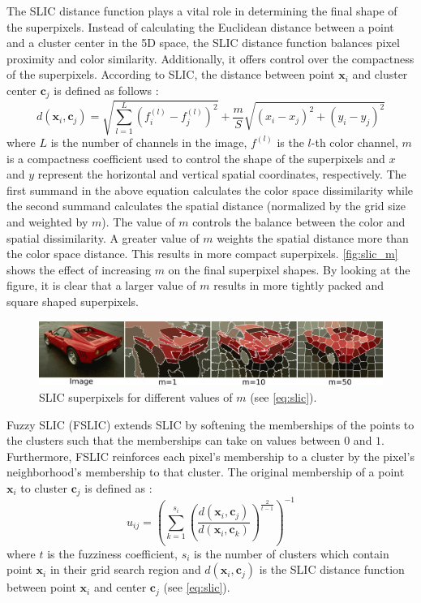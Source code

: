 The SLIC distance function plays a vital role in determining the final shape of the superpixels. Instead of calculating the Euclidean distance between a point and a cluster center in the 5D space, the SLIC distance function balances pixel proximity and color similarity. Additionally, it offers control over the compactness of the superpixels. According to SLIC, the distance between point $\mathbf{x}_i$ and cluster center $\mathbf{c}_j$ is defined as follows \parencite{achanta2010slic}:
\begin{equation}
    d(\mathbf{x}_i, \mathbf{c}_j) = \sqrt{\sum_{l=1}^{L}{(f_i^{(l)} - f_j^{(l)})^2}} + \frac{m}{S}\sqrt{(x_i-x_j)^2 + (y_i-y_j)^2}
    \label{eq:slic}
\end{equation}
where $L$ is the number of channels in the image, $f^{(l)}$ is the $l$-th color channel, $m$ is a compactness coefficient used to control the shape of the superpixels and $x$ and $y$ represent the horizontal and vertical spatial coordinates, respectively. The first summand in the above equation calculates the color space dissimilarity while the second summand calculates the spatial distance (normalized by the grid size and weighted by $m$). The value of $m$ controls the balance between the color and spatial dissimilarity. A greater value of $m$ weights the spatial distance more than the color space distance. This results in more compact superpixels. \autoref{fig:slic_m} shows the effect of increasing $m$ on the final superpixel shapes. By looking at the figure, it is clear that a larger value of $m$ results in more tightly packed and square shaped superpixels.

\begin{figure}[t]
     \centering
     \includegraphics[width=\textwidth]{figures/slic_m.pdf}
    \caption{SLIC superpixels for different values of $m$ (see \autoref{eq:slic}).}
    \label{fig:slic_m}
\end{figure}

Fuzzy SLIC (FSLIC) \parencite{wu2020fuzzy} extends SLIC by softening the memberships of the points to the clusters such that the memberships can take on values between $0$ and $1$. Furthermore, FSLIC reinforces each pixel's membership to a cluster by the pixel's neighborhood's membership to that cluster. The original membership of a point $\mathbf{x}_i$ to cluster $\mathbf{c}_j$ is defined as \parencite{wu2020fuzzy}:
\begin{equation}
    u_{ij} = \left( \sum^{s_i}_{k=1}{\left(\frac{d(\mathbf{x}_i, \mathbf{c}_j)}{d(\mathbf{x}_i, \mathbf{c}_k)}\right)^{\frac{2}{t-1}} } \right)^{-1}
\end{equation}
where $t$ is the fuzziness coefficient, $s_i$ is the number of clusters which contain point $\mathbf{x}_i$ in their grid search region and $d(\mathbf{x}_i, \mathbf{c}_j)$ is the SLIC distance function between point $\mathbf{x}_i$ and center $\mathbf{c}_j$ (see \autoref{eq:slic}).

